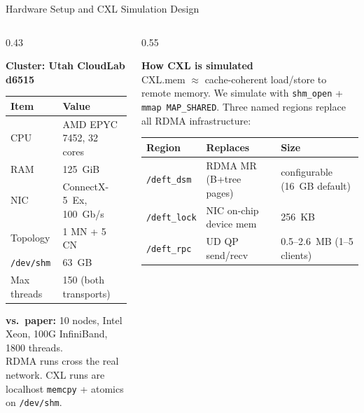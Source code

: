 \documentclass[aspectratio=169,8pt]{beamer}
\newcommand{\sys}[1]{\texttt{#1}}
\begin{document}
\begin{frame}{Hardware Setup and CXL Simulation Design}

\begin{columns}[T,onlytextwidth]
\begin{column}{0.43\textwidth}

\textbf{Cluster: Utah CloudLab d6515}\\[0.4em]
{\small
\begin{tabular}{ll}
\toprule
Item & Value \\
\midrule
CPU & AMD EPYC 7452, 32 cores \\
RAM & 125~GiB \\
NIC & ConnectX-5~Ex, 100~Gb/s \\
Topology & 1 MN + 5 CN \\
\texttt{/dev/shm} & 63~GB \\
Max threads & 150 (both transports) \\
\bottomrule
\end{tabular}
}

\vspace{0.6em}
\small \textbf{vs.\ paper:} 10 nodes, Intel Xeon, 100G InfiniBand, 1800 threads.\\[0.3em]
RDMA runs cross the real network. CXL runs are localhost \sys{memcpy} + atomics on \texttt{/dev/shm}.

\end{column}
\begin{column}{0.55\textwidth}

\textbf{How CXL is simulated}\\[0.3em]
\small CXL.mem $\approx$ cache-coherent load/store to remote memory. We simulate with \sys{shm\_open} + \sys{mmap MAP\_SHARED}. Three named regions replace all RDMA infrastructure:

\vspace{0.3em}
{\small
\begin{tabular}{lll}
\toprule
Region & Replaces & Size \\
\midrule
\sys{/deft\_dsm} & RDMA MR (B+tree pages) & configurable (16~GB default) \\
\sys{/deft\_lock} & NIC on-chip device mem & 256~KB \\
\sys{/deft\_rpc} & UD QP send/recv & 0.5--2.6~MB (1--5 clients) \\
\bottomrule
\end{tabular}
}


\end{column}
\end{columns}
\end{frame}
\end{document}
